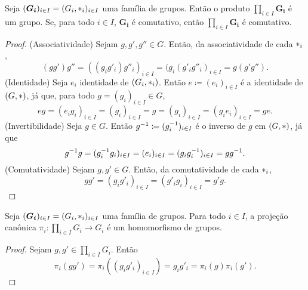 \begin{prop}
\label{alge:prop.gru.prod}
Seja $(\bm{G_i})_{i \in I}=(G_i,\ast_i)_{i \in I}$ uma família de grupos. Então o produto $\prod_{i \in I} \bm{G_i}$ é um grupo. Se, para todo $i \in I$, $\bm{G_i}$ é comutativo, então $\prod_{i \in I} \bm{G_i}$ é comutativo.
\end{prop}
\begin{proof}
(Associatividade) Sejam $g,g',g'' \in G$. Então, da associatividade de cada $\ast_i$,
		\begin{equation*}
		(gg')g'' = ((g_ig'_i)g''_i)_{i \in I} = (g_i(g'_ig''_i)_{i \in I} = g(g'g'').
		\end{equation*}
	(Identidade) Seja $e_i$ identidade de $(G_i, \ast _i)$. Então $e \coloneqq (e_i)_{i \in I}$ é a identidade de $(G, \ast )$, já que, para todo $g=(g_i)_{i \in I} \in G$,
		\begin{equation*}
		eg = (e_ig_i)_{i \in I} = (g_i)_{i \in I} = g = (g_i)_{i \in I} =(g_ie_i)_{i \in I} = ge.
		\end{equation*}
	(Invertibilidade) Seja $g \in G$. Então $g^{-1} \coloneqq (g_i^{-1})_{i \in I}$ é o inverso de $g$ em $(G, \ast )$, já que
	\begin{equation*}
	g^{-1} g = (g_i^{-1} g_i)_{i \in I} = (e_i)_{i \in I} = (g_ig_i^{-1})_{i \in I} = gg^{-1}.
	\end{equation*}
	(Comutatividade) Sejam $g,g' \in G$. Então, da comutatividade de cada $ \ast _i$,
	\begin{equation*}
	gg' = (g_ig'_i)_{i \in I} = (g'_ig_i)_{i \in I} = g'g.
	\end{equation*}
\end{proof}

\begin{prop}
Seja $(\bm{G_i})_{i \in I}=(G_i,\ast_i)_{i \in I}$ uma família de grupos. Para todo $i \in I$, a projeção canônica $\pi_i: \prod_{i \in I} G_i \to G_i$ é um homomorfismo de grupos.
\end{prop}
\begin{proof}
Sejam $g,g' \in \prod_{i \in I} G_i$. Então
	\begin{equation*}
	\pi_i(gg') = \pi_i((g_ig'_i)_{i \in I}) = g_ig'_i = \pi_i(g)\pi_i(g').
	\end{equation*}
\end{proof}

